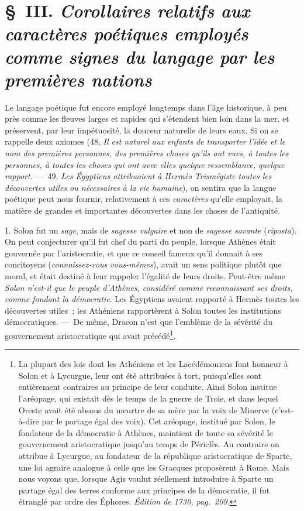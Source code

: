 \documentclass[french,twoside]{book} %
\begin{document}
\section[{§ III. Corollaires relatifs aux caractères poétiques employés comme signes du langage par les premières nations}]{§ III. {\itshape Corollaires relatifs aux caractères poétiques employés comme signes du langage par les premières nations}}
\noindent Le langage poétique fut encore employé longtemps dans l’âge historique, à peu près comme les fleuves larges et rapides qui s’étendent bien loin dans la mer, et préservent, par leur impétuosité, la  douceur naturelle de leurs eaux. Si on se rappelle deux axiomes (48, {\itshape Il est naturel aux enfants de transporter l’idée et le nom des premières personnes, des premières choses qu’ils ont vues, à toutes les personnes, à toutes les choses qui ont avec elles quelque ressemblance, quelque rapport.} — 49. {\itshape Les Égyptiens attribuaient à Hermès Trismégiste toutes les découvertes utiles ou nécessaires à la vie humaine}), on sentira que la langue poétique peut nous fournir, relativement à ces {\itshape caractères} qu’elle employait, la matière de grandes et importantes découvertes dans les choses de l’antiquité.\par
1. Solon fut un {\itshape sage}, mais de {\itshape sagesse vulgaire} et non de {\itshape sagesse savante} ({\itshape riposta}). On peut conjecturer qu’il fut chef du parti du peuple, lorsque Athènes était gouvernée par l’aristocratie, et que ce conseil fameux qu’il donnait à ses concitoyens ({\itshape connaissez-vous vous-mêmes}), avait un sens politique plutôt que moral, et était destiné à leur rappeler l’égalité de leurs droits. Peut-être même {\itshape Solon n’est-il que le peuple d’Athènes, considéré comme reconnaissant ses droits, comme fondant la démocratie}. Les Égyptiens avaient rapporté à Hermès toutes les découvertes utiles ; les Athéniens rapportèrent à Solon toutes les institutions démocratiques. — De même, Dracon n’est que l’emblème de la sévérité du gouvernement aristocratique qui avait précédé\footnote{La plupart des lois dont les Athéniens et les Lacédémoniens font honneur à Solon et à Lycurgue, leur ont été attribuées à tort, puisqu’elles sont entièrement contraires au principe de leur conduite. Ainsi Solon institue l’aréopage, qui existait dès le temps de la guerre de Troie, et dans lequel Oreste avait été absous du meurtre de sa mère par la voix de Minerve (c’est-à-dire par le partage égal des voix). Cet aréopage, institué par Solon, le fondateur de la démocratie à Athènes, maintient de toute sa sévérité le gouvernement aristocratique jusqu’au temps de Périclès. Au contraire on attribue à Lycurgue, au fondateur de la république aristocratique de Sparte, une loi agraire analogue à celle que les Gracques proposèrent à Rome. Mais nous voyons que, lorsque Agis voulut réellement introduire à Sparte un partage égal des terres conforme aux principes de la démocratie, il fut étranglé par ordre des Éphores. {\itshape Édition de 1730, pag. 209.}}.\par
\end{document}
